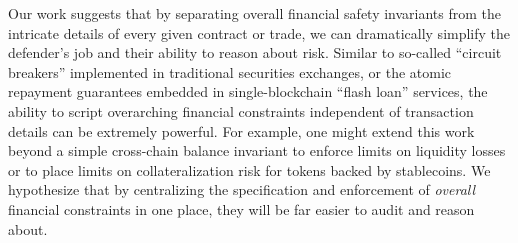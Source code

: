 Our work suggests that by separating overall financial safety
invariants from the intricate details of every given contract or
trade, we can dramatically simplify the defender's job and their
ability to reason about risk.  Similar to so-called ``circuit
breakers'' implemented in traditional securities exchanges, or the
atomic repayment guarantees embedded in single-blockchain ``flash
loan'' services, the ability to script overarching financial
constraints independent of transaction details can be extremely
powerful.  For example, one might extend this work beyond a simple
cross-chain balance invariant to enforce limits on liquidity losses or
to place limits on collateralization risk for tokens backed by
stablecoins.  We hypothesize that by centralizing the specification and
enforcement of \emph{overall} financial constraints in one place, they
will be far easier to audit and reason about.



    
